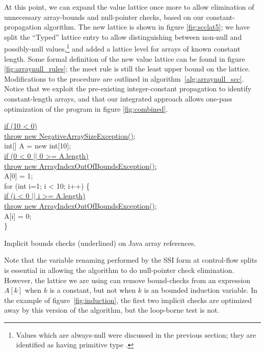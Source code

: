 \documentclass[12pt,titlepage,twoside]{article}
\begin{document}
At this point, we can expand the value lattice once more to allow
elimination of unnecessary array-bounds and null-pointer checks, based
on our constant-propagation algorithm.  The new lattice is shown in
figure \ref{fig:scclat5}; we have split the ``Typed'' lattice entry to
allow distinguishing between non-null and possibly-null
values,\footnote{Values which are always-null were discussed in the
previous section; they are identified as having primitive type .}
and added a lattice level for arrays of known constant length.  
Some formal definition of the new value lattice can be found in
figure \ref{fig:arraynull_rules}; the meet rule is still the least upper
bound on the lattice.  Modifications to the  procedure are
outlined in algorithm~\ref{alg:arraynull_scc}.
Notice that we exploit the pre-existing integer-constant propagation to
identify constant-length arrays, and that our integrated approach
allows one-pass optimization of the program in figure \ref{fig:combined}.

\begin{myfigure}\newcommand{\implicitcheck}[1]{\underline{#1}}
\begin{samplecode}
\implicitcheck{if (10 < 0)}\\
\>\implicitcheck{throw new NegativeArraySizeException();}\\
int[] A = new int[10]; \\
\implicitcheck{if (0 < 0 || 0 >= A.length)}\\
\>\implicitcheck{throw new ArrayIndexOutOfBoundsException();}\\
A[0] = 1;\\
for (int i=1; i < 10; i++) \{\\
\>\implicitcheck{if (i < 0 || i >= A.length)}\\
\>\>\implicitcheck{throw new ArrayIndexOutOfBoundsException();}\\
\>A[i] = 0;\\
\}\\
\end{samplecode}
\caption[Implicit bounds checks on Java array references.]
{Implicit bounds checks (underlined) on Java array references.}
\label{fig:induction}
\end{myfigure}
Note that the variable renaming performed by the SSI form at
control-flow splits is essential in allowing the algorithm to do 
null-pointer check elimination.  However, the lattice we are using
can remove bound-checks from an expression $A[k]$ when $k$ is a
constant, but not when $k$ is an bounded induction variable.
In the example of figure~\vref{fig:induction}, the first two implicit
checks are optimized away by this version of the algorithm, but the
loop-borne test is not. 
\end{document}
